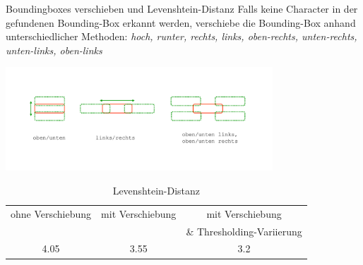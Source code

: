 \begin{frame}{Boundingboxes verschieben und Levenshtein-Distanz}
Falls keine Character in der gefundenen Bounding-Box erkannt werden, verschiebe die Bounding-Box anhand unterschiedlicher Methoden: {\textit{hoch, runter, rechts, links, oben-rechts, unten-rechts, unten-links, oben-links}}
\begin{center}
    \includegraphics[width=0.75\textwidth]{img/bbox_shift}
\end{center}
\begin{table}[H]
\centering
\caption{Levenshtein-Distanz}
\begin{tabular}{ccc}
ohne Verschiebung        & mit Verschiebung         & mit Verschiebung \\
                         &                         & \& Thresholding-Variierung \\
4.05 & 3.55 & 3.2
\end{tabular}
\end{table}
\end{frame}

